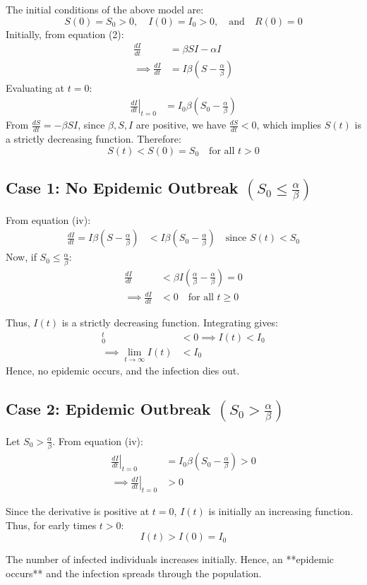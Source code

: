 The initial conditions of the above model are:
\[
S(0) = S_0 > 0, \quad I(0) = I_0 > 0, \quad \text{and} \quad R(0) = 0
\]
\noindent Initially, from equation (2):
\begin{align*}
    \frac{dI}{dt} &= \beta S I - \alpha I \\
    \implies \frac{dI}{dt} &= I \beta \left(S - \frac{\alpha}{\beta}\right)
\end{align*}
\noindent Evaluating at $t = 0$:
\begin{align*}
    \left. \frac{dI}{dt} \right|_{t=0} &= I_0 \beta \left(S_0 - \frac{\alpha}{\beta}\right) \tag{iv}
\end{align*}
\noindent From $\frac{dS}{dt} = -\beta S I$, since $\beta, S, I$ are positive, we have $\frac{dS}{dt} < 0$, which implies $S(t)$ is a strictly decreasing function. Therefore:
\[
S(t) < S(0) = S_0 \quad \text{for all } t > 0
\]
\subsection*{Case 1: No Epidemic Outbreak $\left(S_0 \le \frac{\alpha}{\beta}\right)$}
\noindent From equation (iv):
\begin{align*}
    \frac{dI}{dt} = I \beta \left(S - \frac{\alpha}{\beta}\right) &< I \beta \left(S_0 - \frac{\alpha}{\beta}\right) \quad \text{since } S(t) < S_0
\end{align*}
\noindent Now, if $S_0 \le \frac{\alpha}{\beta}$:
\begin{align*}
    \frac{dI}{dt} &< \beta I \left(\frac{\alpha}{\beta} - \frac{\alpha}{\beta}\right) = 0 \\
    \implies \frac{dI}{dt} &< 0 \quad \text{for all } t \ge 0
\end{align*}

\noindent Thus, $I(t)$ is a strictly decreasing function. Integrating gives:
\begin{align*}
    [I]_0^t &< 0 \implies I(t) < I_0 \\
    \implies \lim_{t \to \infty} I(t) &< I_0
\end{align*}
Hence, no epidemic occurs, and the infection dies out.

\vspace{1em}
\subsection*{Case 2: Epidemic Outbreak $\left(S_0 > \frac{\alpha}{\beta}\right)$}

\noindent Let $S_0 > \frac{\alpha}{\beta}$. From equation (iv):
\begin{align*}
    \left. \frac{dI}{dt} \right|_{t=0} &= I_0 \beta \left(S_0 - \frac{\alpha}{\beta}\right) > 0 \\
    \implies \left. \frac{dI}{dt} \right|_{t=0} &> 0
\end{align*}

\noindent Since the derivative is positive at $t = 0$, $I(t)$ is initially an increasing function. Thus, for early times $t > 0$:
\[
I(t) > I(0) = I_0
\]

\noindent The number of infected individuals increases initially. Hence, an **epidemic occurs** and the infection spreads through the population.